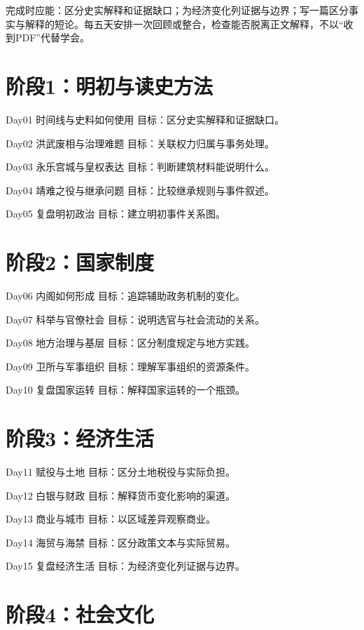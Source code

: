 \documentclass[11pt]{article}
\newcommand{\Needspace}[1]{\par\ifdim\dimexpr\pagegoal-\pagetotal\relax<#1\relax\newpage\fi}
\begin{document}
完成时应能：区分史实解释和证据缺口；为经济变化列证据与边界；写一篇区分事实与解释的短论。每五天安排一次回顾或整合，检查能否脱离正文解释，不以“收到PDF”代替学会。

\Needspace{5\baselineskip}\section*{阶段1：明初与读史方法}

Day01  时间线与史料如何使用
目标：区分史实解释和证据缺口。

Day02  洪武废相与治理难题
目标：关联权力归属与事务处理。

Day03  永乐宫城与皇权表达
目标：判断建筑材料能说明什么。

Day04  靖难之役与继承问题
目标：比较继承规则与事件叙述。

Day05  复盘明初政治
目标：建立明初事件关系图。

\Needspace{5\baselineskip}\section*{阶段2：国家制度}

Day06  内阁如何形成
目标：追踪辅助政务机制的变化。

Day07  科举与官僚社会
目标：说明选官与社会流动的关系。

Day08  地方治理与基层
目标：区分制度规定与地方实践。

Day09  卫所与军事组织
目标：理解军事组织的资源条件。

Day10  复盘国家运转
目标：解释国家运转的一个瓶颈。

\Needspace{5\baselineskip}\section*{阶段3：经济生活}

Day11  赋役与土地
目标：区分土地税役与实际负担。

Day12  白银与财政
目标：解释货币变化影响的渠道。

Day13  商业与城市
目标：以区域差异观察商业。

Day14  海贸与海禁
目标：区分政策文本与实际贸易。

Day15  复盘经济生活
目标：为经济变化列证据与边界。

\Needspace{5\baselineskip}\section*{阶段4：社会文化}
\end{document}
